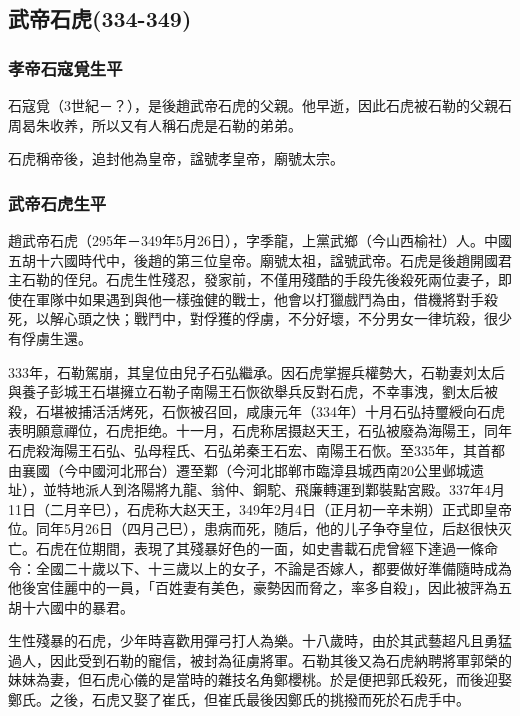 
\subsection{武帝石虎\tiny(334-349)}

\subsubsection{孝帝石寇覓生平}

石寇覓（3世紀－？），是後趙武帝石虎的父親。他早逝，因此石虎被石勒的父親石周曷朱收养，所以又有人稱石虎是石勒的弟弟。

石虎稱帝後，追封他為皇帝，諡號孝皇帝，廟號太宗。

\subsubsection{武帝石虎生平}

趙武帝石虎（295年－349年5月26日），字季龍，上黨武鄉（今山西榆社）人。中國五胡十六國時代中，後趙的第三位皇帝。廟號太祖，諡號武帝。石虎是後趙開國君主石勒的侄兒。石虎生性殘忍，發家前，不僅用殘酷的手段先後殺死兩位妻子，即使在軍隊中如果遇到與他一樣強健的戰士，他會以打獵戲鬥為由，借機將對手殺死，以解心頭之快；戰鬥中，對俘獲的俘虜，不分好壞，不分男女一律坑殺，很少有俘虜生還。

333年，石勒駕崩，其皇位由兒子石弘繼承。因石虎掌握兵權勢大，石勒妻刘太后與養子彭城王石堪擁立石勒子南陽王石恢欲舉兵反對石虎，不幸事洩，劉太后被殺，石堪被捕活活烤死，石恢被召回，咸康元年（334年）十月石弘持璽綬向石虎表明願意禪位，石虎拒绝。十一月，石虎称居摄赵天王，石弘被廢為海陽王，同年石虎殺海陽王石弘、弘母程氏、石弘弟秦王石宏、南陽王石恢。至335年，其首都由襄國（今中國河北邢台）遷至鄴（今河北邯郸市臨漳县城西南20公里邺城遗址），並特地派人到洛陽將九龍、翁仲、銅駝、飛廉轉運到鄴裝點宮殿。337年4月11日（二月辛巳），石虎称大赵天王，349年2月4日（正月初一辛未朔）正式即皇帝位。同年5月26日（四月己巳），患病而死，随后，他的儿子争夺皇位，后赵很快灭亡。石虎在位期間，表現了其殘暴好色的一面，如史書載石虎曾經下達過一條命令：全國二十歲以下、十三歲以上的女子，不論是否嫁人，都要做好準備隨時成為他後宮佳麗中的一員，「百姓妻有美色，豪勢因而脅之，率多自殺」，因此被評為五胡十六國中的暴君。

生性殘暴的石虎，少年時喜歡用彈弓打人為樂。十八歲時，由於其武藝超凡且勇猛過人，因此受到石勒的寵信，被封為征虜將軍。石勒其後又為石虎納聘將軍郭榮的妹妹為妻，但石虎心儀的是當時的雜技名角鄭櫻桃。於是便把郭氏殺死，而後迎娶鄭氏。之後，石虎又娶了崔氏，但崔氏最後因鄭氏的挑撥而死於石虎手中。

